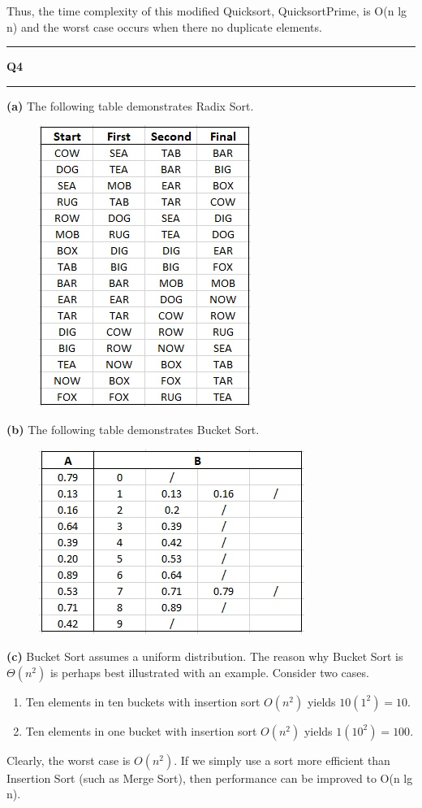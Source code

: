 \documentclass[11pt]{article}
\newcommand\question[2]{\vspace{.25in}\hrule\textbf{#1 #2}\vspace{.5em}\hrule\vspace{.10in}}
\renewcommand\part[1]{\vspace{.10in}\textbf{(#1)}}
\begin{document}
Thus, the time complexity of this modified Quicksort, QuicksortPrime, is O(n lg n) and the worst case occurs when there no duplicate elements.

\question{Q4}{}
\part{a}
The following table demonstrates Radix Sort.
\begin{figure}[htbp!]
  \centering
  \includegraphics{one.jpg}
\end{figure}

\part{b}
The following table demonstrates Bucket Sort.
\begin{figure}[htbp!]
  \centering
  \includegraphics{two.jpg}
\end{figure}
\newpage

\part{c}
Bucket Sort assumes a uniform distribution. The reason why Bucket Sort is $\Theta(n^2)$ is perhaps best illustrated with an example. Consider two cases.
\begin{enumerate}
	\item Ten elements in ten buckets with insertion sort $O(n^2)$ yields $10(1^2) = 10$.
	\item Ten elements in one bucket with insertion sort $O(n^2)$ yields $1(10^2) = 100$.
\end{enumerate}
Clearly, the worst case is $O(n^2)$. If we simply use a sort more efficient than Insertion Sort (such as Merge Sort), then performance can be improved to O(n lg n).
\end{document}
